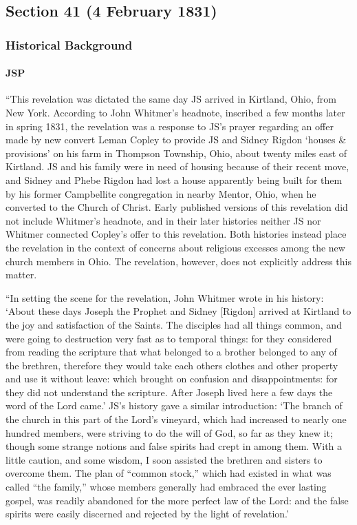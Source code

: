 \subsection{Section 41 (4 February 1831)}
	\label{DC41}
	
	\subsubsection{Historical Background}
		\label{DC41-HB}
		
		\paragraph{JSP}
		
			``This revelation was dictated the same day JS arrived in Kirtland, Ohio, from New York. According to John Whitmer's headnote, inscribed a few months later in spring 1831, the revelation was a response to JS's prayer regarding an offer made by new convert Leman Copley to provide JS and Sidney Rigdon `houses \& provisions' on his farm in Thompson Township, Ohio, about twenty miles east of Kirtland. JS and his family were in need of housing because of their recent move, and Sidney and Phebe Rigdon had lost a house apparently being built for them by his former Campbellite congregation in nearby Mentor, Ohio, when he converted to the Church of Christ. Early published versions of this revelation did not include Whitmer's headnote, and in their later histories neither JS nor Whitmer connected Copley's offer to this revelation. Both histories instead place the revelation in the context of concerns about religious excesses among the new church members in Ohio. The revelation, however, does not explicitly address this matter.
			
			``In setting the scene for the revelation, John Whitmer wrote in his history: `About these days Joseph the Prophet and Sidney [Rigdon] arrived at Kirtland to the joy and satisfaction of the Saints. The disciples had all things common, and were going to destruction very fast as to temporal things: for they considered from reading the scripture that what belonged to a brother belonged to any of the brethren, therefore they would take each others clothes and other property and use it without leave: which brought on confusion and disappointments: for they did not understand the scripture. After Joseph lived here a few days the word of the Lord came.' JS's history gave a similar introduction: `The branch of the church in this part of the Lord's vineyard, which had increased to nearly one hundred members, were striving to do the will of God, so far as they knew it; though some strange notions and false spirits had crept in among them. With a little caution, and some wisdom, I soon assisted the brethren and sisters to overcome them. The plan of ``common stock,'' which had existed in what was called ``the family,'' whose members generally had embraced the ever lasting gospel, was readily abandoned for the more perfect law of the Lord: and the false spirits were easily discerned and rejected by the light of revelation.'
			
